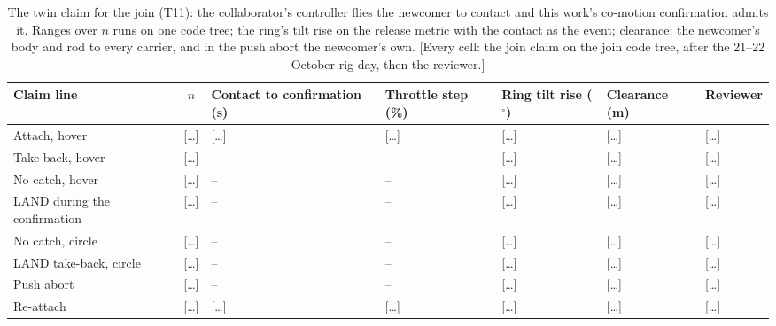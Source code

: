 
\begin{table}[htbp]
  \centering
  \footnotesize
  \caption[The twin claim for the join]{The twin claim for the join (T11): the collaborator's controller flies the
  newcomer to contact and this work's co-motion confirmation admits it. Ranges over $n$ runs on one code tree; the
  ring's tilt rise on the release metric with the contact as the event; clearance: the newcomer's body and rod to every
  carrier, and in the push abort the newcomer's own. [Every cell: the join claim on the join code tree, after the
  21--22 October rig day, then the reviewer.]}
  \label{tab:T11}
  \begin{tabularx}{\textwidth}{XcYYYYl}
    \toprule
    Claim line & $n$ & Contact to confirmation (s) & Throttle step (\%) & Ring tilt rise ($^\circ$) & Clearance (m)
      & Reviewer \\
    \midrule
    Attach, hover & [\dots] & [\dots] & [\dots] & [\dots] & [\dots] & [\dots] \\
    Take-back, hover & [\dots] & -- & -- & [\dots] & [\dots] & [\dots] \\
    No catch, hover & [\dots] & -- & -- & [\dots] & [\dots] & [\dots] \\
    LAND during the confirmation & [\dots] & -- & -- & [\dots] & [\dots] & [\dots] \\
    No catch, circle & [\dots] & -- & -- & [\dots] & [\dots] & [\dots] \\
    LAND take-back, circle & [\dots] & -- & -- & [\dots] & [\dots] & [\dots] \\
    Push abort & [\dots] & -- & -- & [\dots] & [\dots] & [\dots] \\
    Re-attach & [\dots] & [\dots] & [\dots] & [\dots] & [\dots] & [\dots] \\
    \bottomrule
  \end{tabularx}
\end{table}

